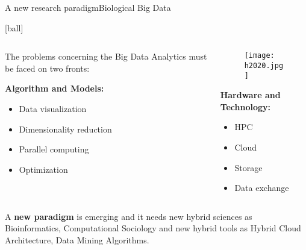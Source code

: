 \documentclass{standalone}
\begin{document}
\begin{frame}{A new research paradigm}{Biological Big Data}

  [ball]

  \begin{columns}

    \begin{column}{0.5\textwidth}

      The problems concerning the Big Data Analytics must be faced on two fronts:

      \vspace{0.6cm}
      \textbf{Algorithm and Models:}

      \begin{itemize}

        \item Data visualization
        \item Dimensionality reduction
        \item Parallel computing
        \item Optimization

      \end{itemize}

    \end{column}
    \begin{column}{0.5\textwidth}

      \begin{figure}
        \centering
        \texttt{[image: h2020.jpg]}
      \end{figure}

      \textbf{Hardware and Technology:}

      \begin{itemize}

        \item HPC
        \item Cloud
        \item Storage
        \item Data exchange

      \end{itemize}

    \end{column}
  \end{columns}

  \vspace{0.5cm}

  A \textbf{new paradigm} is emerging and it needs new hybrid sciences as Bioinformatics, Computational Sociology and new hybrid tools as Hybrid Cloud Architecture, Data Mining Algorithms.

\end{frame}
\end{document}
